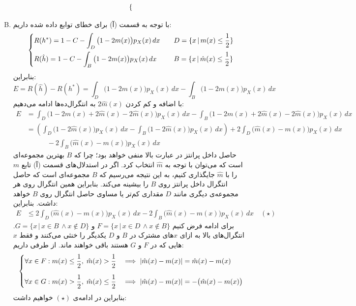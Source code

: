\documentclass[a4paper, 12pt]{article}
\begin{document}
\begin{enumerate}[A)]
\[\begin{dcases}
	\end{dcases}
	\]
	\item
	با توجه به قسمت (آ) برای خطای توابع داده شده داریم:
	\[
	\begin{dcases}
		R(h^\ast) = 1 - C - \int_D \big(1-2m(x)\big)p_X(x)\,dx &\quad D = \{x\,|\, m(x) \le \frac{1}{2}\} \\
		R(\hat{h}) = 1 - C - \int_B \big(1-2m(x)\big)p_X(x)\,dx &\quad B = \{x \,|\, \hat{m}(x) \le \frac{1}{2}\}
	\end{dcases}
	\]
	بنابراین:
	\[
	E = R(\hat{h}) - R(h^\ast) = \int_D \big(1-2m(x)\big)p_X(x)\,dx - \int_B \big(1-2m(x)\big)p_X(x)\,dx
	\]
	با اضافه و کم کردن
	$2\hat{m}(x)$
	به انتگرال‌ده‌ها ادامه می‌دهیم:
	\[
	\begin{aligned}
		E &= \int_D \big(1-2m(x)+2\hat{m}(x)-2\hat{m}(x)\big)p_X(x)\,dx - \int_B \big(1-2m(x)+2\hat{m}(x)-2\hat{m}(x)\big)p_X(x)\,dx \\[0.7em]
			&= \left(\int_D \big(1-2\hat{m}(x)\big)p_X(x)\,dx - \int_B \big(1-2\hat{m}(x)\big)p_X(x)\,dx\right) + 2 \int_D \big(\hat{m}(x)-m(x)\big)p_X(x)\,dx \\[0.6em] &\qquad\quad - 2 \int_B \big(\hat{m}(x)-m(x)\big)p_X(x)\,dx
	\end{aligned}
	\]
	حاصل داخل پرانتز در عبارت بالا منفی خواهد بود؛ چرا که $B$ بهترین مجموعه‌ای است که می‌توان با توجه به $\hat{m}$ انتخاب کرد. اگر در استدلال‌های قسمت (آ) تابع $m$ را با $\hat{m}$ جایگذاری کنیم، به این نتیجه می‌رسیم که $B$ مجموعه‌ای است که حاصل انتگرال داخل پرانتز روی $B$‌ را بیشینه می‌کند. بنابراین همین انتگرال روی هر مجموعه‌ی دیگری مانند $D$ مقداری کم‌تر یا مساوی حاصل انتگرال روی $B$ خواهد داشت. بنابراین:
	\[
	\begin{aligned}
		E &\le 2 \int_D \big(\hat{m}(x)-m(x)\big)p_X(x)\,dx - 2 \int_B \big(\hat{m}(x)-m(x)\big)p_X(x)\,dx \quad (\star)
	\end{aligned}
	\]
	برای ادامه فرض کنیم
	$F = \{x \,|\, x\in D \, \land x\notin B\}$
	و
	$G = \{x \,|\, x\in B \, \land x\notin D\}$.
	انتگرال‌های بالا به ازای $x$های مشترک در $B$ و $D$ یکدیگر را خنثی می‌کنند و فقط $x$هایی که در $F$ و $G$ هستند باقی خواهند ماند. از طرفی داریم:
	\[
	\begin{dcases}
		\forall x \in F: m(x) \le \frac{1}{2},\; \hat{m}(x) > \frac{1}{2} & \implies |\hat{m}(x) - m(x)| = \hat{m}(x) - m(x) \\[0.6em]
		\forall x \in G: m(x) > \frac{1}{2},\; \hat{m}(x) \le \frac{1}{2} & \implies |\hat{m}(x) - m(x)| = -\big(\hat{m}(x) - m(x)\big) 
	\end{dcases}
	\]
	بنابراین در ادامه‌ی $(\star)$ خواهیم داشت:

\end{enumerate}
\end{document}
